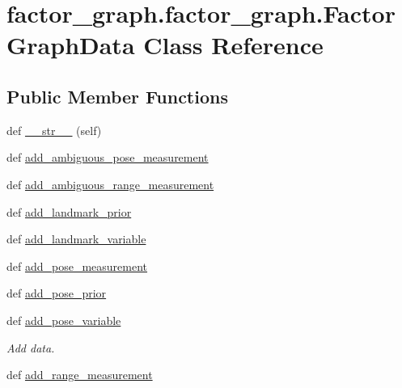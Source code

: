 \hypertarget{classfactor__graph_1_1factor__graph_1_1FactorGraphData}{}\section{factor\+\_\+graph.\+factor\+\_\+graph.\+Factor\+Graph\+Data Class Reference}
\label{classfactor__graph_1_1factor__graph_1_1FactorGraphData}
\subsection*{Public Member Functions}
\begin{DoxyCompactItemize}
\item
def \hyperlink{classfactor__graph_1_1factor__graph_1_1FactorGraphData_ac112f970b994f368bc602032ab22eded}{\+\_\+\+\_\+str\+\_\+\+\_\+} (self)
\item
def \hyperlink{classfactor__graph_1_1factor__graph_1_1FactorGraphData_a61153afd4d0d497051682c9327e62ad7}{add\+\_\+ambiguous\+\_\+pose\+\_\+measurement}
\item
def \hyperlink{classfactor__graph_1_1factor__graph_1_1FactorGraphData_a36d429a82a2d5ec8500e1820fd084751}{add\+\_\+ambiguous\+\_\+range\+\_\+measurement}
\item
def \hyperlink{classfactor__graph_1_1factor__graph_1_1FactorGraphData_a92edde858e5a9f2a1e549c10a67d7616}{add\+\_\+landmark\+\_\+prior}
\item
def \hyperlink{classfactor__graph_1_1factor__graph_1_1FactorGraphData_a18ed6e785925ec4c2325f9ef730851cb}{add\+\_\+landmark\+\_\+variable}
\item
def \hyperlink{classfactor__graph_1_1factor__graph_1_1FactorGraphData_a914107fbd2d1d94c954b3c12793c6dcb}{add\+\_\+pose\+\_\+measurement}
\item
def \hyperlink{classfactor__graph_1_1factor__graph_1_1FactorGraphData_a3a7effb5dd6f96ad933f43e5ed648111}{add\+\_\+pose\+\_\+prior}
\item
def \hyperlink{classfactor__graph_1_1factor__graph_1_1FactorGraphData_ab2fa2c6e82601fc9c2d11632873a02db}{add\+\_\+pose\+\_\+variable}
\begin{DoxyCompactList}\small\item\em Add data. \end{DoxyCompactList}\item
def \hyperlink{classfactor__graph_1_1factor__graph_1_1FactorGraphData_a2263266eedfd6bc65a82f83fa6b486c8}{add\+\_\+range\+\_\+measurement}

\end{DoxyCompactItemize}
